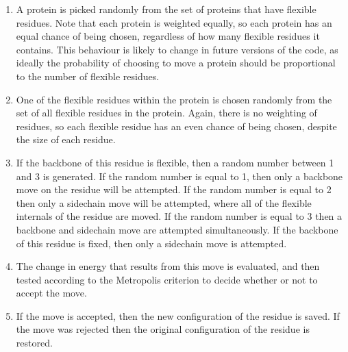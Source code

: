 \documentclass[letterpaper,10pt,english]{manual}
\begin{document}
\begin{enumerate}
\item {} 
A protein is picked randomly from the set of proteins that have flexible residues. Note that each protein is weighted equally, so each protein has an equal chance of being chosen, regardless of how many flexible residues it contains. This behaviour is likely to change in future versions of the code, as ideally the probability of choosing to move a protein should be proportional to the number of flexible residues.

\item {} 
One of the flexible residues within the protein is chosen randomly from the set of all flexible residues in the protein. Again, there is no weighting of residues, so each flexible residue has an even chance of being chosen, despite the size of each residue.

\item {} 
If the backbone of this residue is flexible, then a random number between 1 and 3 is generated. If the random number is equal to 1, then only a backbone move on the residue will be attempted. If the random number is equal to 2 then only a sidechain move will be attempted, where all of the flexible internals of the residue are moved. If the random number is equal to 3 then a backbone and sidechain move are attempted simultaneously. If the backbone of this residue is fixed, then only a sidechain move is attempted.

\item {} 
The change in energy that results from this move is evaluated, and then tested according to the Metropolis criterion to decide whether or not to accept the move.

\item {} 
If the move is accepted, then the new configuration of the residue is saved. If the move was rejected then the original configuration of the residue is restored.

\end{enumerate}
\end{document}
